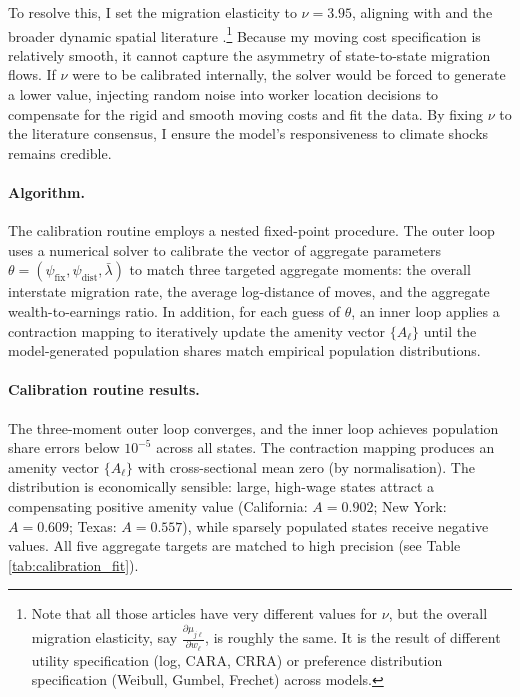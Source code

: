 \documentclass[12pt, a4paper]{article}
\begin{document}
To resolve this, I set the migration elasticity to $\nu = 3.95$, aligning with \citet{dvorkin_geography_2025} and the broader dynamic spatial literature \citet{caliendo_trade_2019, kleinman_dynamic_2023, kennan_effect_2011}.\footnote{Note that all those articles have very different values for $\nu$, but the overall migration elasticity, say $\frac{\partial\mu_{j\ell}}{\partial w_\ell}$, is roughly the same. It is the result of different utility specification (log, CARA, CRRA) or preference distribution specification (Weibull, Gumbel, Frechet) across models.}  Because my moving cost specification is relatively smooth, it cannot capture the asymmetry of state-to-state migration flows. If $\nu$ were to be calibrated internally, the solver would be forced to generate a lower value, injecting random noise into worker location decisions to compensate for the rigid and smooth moving costs and fit the data. By fixing $\nu$ to the literature consensus, I ensure the model's responsiveness to climate shocks remains credible.

\paragraph{Algorithm.}
The calibration routine employs a nested fixed-point procedure. The outer loop uses a numerical solver to calibrate the vector of aggregate parameters $\theta = (\psi_{\text{fix}}, \psi_{\text{dist}}, \bar\lambda)$ to match three targeted aggregate moments: the overall interstate migration rate, the average log-distance of moves, and the aggregate wealth-to-earnings ratio. In addition, for each guess of $\theta$, an inner loop applies a contraction mapping to iteratively update the amenity vector $\{A_\ell\}$ until the model-generated population shares match empirical population distributions. 

\paragraph{Calibration routine results.} The three-moment outer loop converges, and the inner loop achieves population share errors below $10^{-5}$ across all states. The contraction mapping produces an amenity vector $\{A_\ell\}$ with cross-sectional mean zero (by normalisation). The distribution is economically sensible: large, high-wage states attract a compensating positive amenity value (California: $A = 0.902$; New York: $A = 0.609$; Texas: $A = 0.557$), while sparsely populated states receive negative values. All five aggregate targets are matched to high precision (see Table \ref{tab:calibration_fit}).
\end{document}
